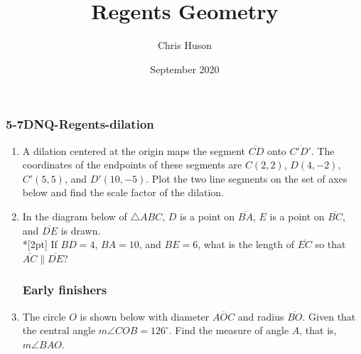 \documentclass[12pt, twoside]{article}
\title{Regents Geometry}
\author{Chris Huson}
\date{September 2020}
\begin{document}
\subsubsection*{5-7DNQ-Regents-dilation}
\begin{enumerate}
\item A dilation centered at the origin maps the segment $\overline{CD}$ onto $\overline{C'D'}$. The coordinates of the endpoints of these segments are $C(2,2)$, $D(4,-2)$, $C'(5,5)$, and $D'(10,-5)$. Plot the two line segments on the set of axes below and find the scale factor of the dilation.
  \begin{flushright}
  \end{flushright}


\item In the diagram below of $\triangle ABC$, $D$ is a point on $\overline{BA}$, $E$ is a point on $\overline{BC}$, and $\overline{DE}$ is drawn. \\*[2pt] 
 If $BD=4$, $BA=10$, and $BE=6$, what is the length of $\overline{EC}$ so that $\overline{AC} \parallel \overline{DE}$?
 
 \begin{flushright}
   \end{flushright}

\newpage
\subsubsection*{Early finishers}

\item The circle $O$ is shown below with diameter $\overline{AOC}$ and radius $\overline{BO}$. Given that the central angle $m\angle COB=126^\circ$. Find the measure of angle $A$, that is, $m\angle BAO$.
\begin{flushright}
\end{flushright} %


\end{enumerate}
\end{document}
